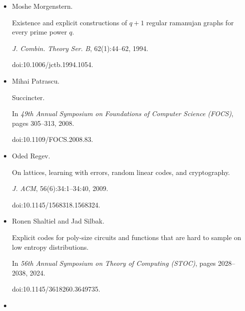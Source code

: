 \documentclass[10pt,a4paper]{article}
\begin{document}
\begin{itemize}
Local recovery in data compression for general sources.


In \emph{2015 IEEE International Symposium on Information Theory
(ISIT)}, pages 2984–2988, 2015.


doi:10.1109/ISIT.2015.7283004.





\item[] 
[36]

Moshe Morgenstern.


Existence and explicit constructions of $q+1$ regular ramanujan
graphs for every prime power $q$.


\emph{J. Combin. Theory Ser. B}, 62(1):44–62, 1994.


doi:10.1006/jctb.1994.1054.





\item[] 
[37]

Mihai Patrascu.


Succincter.


In \emph{49th Annual Symposium on Foundations of Computer Science
(FOCS)}, pages 305–313, 2008.


doi:10.1109/FOCS.2008.83.





\item[] 
[38]

Oded Regev.


On lattices, learning with errors, random linear codes, and
cryptography.


\emph{J. ACM}, 56(6):34:1–34:40, 2009.


doi:10.1145/1568318.1568324.





\item[] 
[39]

Ronen Shaltiel and Jad Silbak.


Explicit codes for poly-size circuits and functions that are hard to
sample on low entropy distributions.


In \emph{56th Annual Symposium on Theory of Computing (STOC)}, pages
2028–2038, 2024.


doi:10.1145/3618260.3649735.





\item[] 
[40]


\end{itemize}
\end{document}
